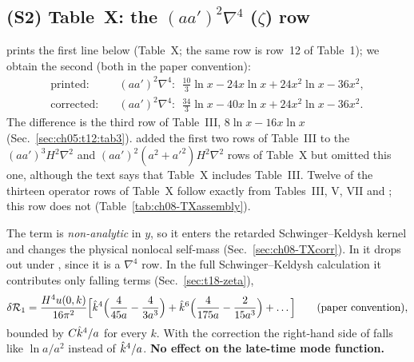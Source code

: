 \subsection*{(S2) Table~X: the $(aa')^2\nabla^4$ ($\zeta$) row}
\begin{discbox}
\PI{} prints the first line below (Table~X; the same row is row~12 of \PII{} Table~1); we obtain the second (both in the paper convention):
\[
\begin{aligned}
\text{printed:}&\quad (aa')^2\nabla^4:\ \ \tfrac{10}{3}\ln x-24x\ln x+24x^2\ln x-36x^2,\\
\text{corrected:}&\quad (aa')^2\nabla^4:\ \ \tfrac{34}{3}\ln x-40x\ln x+24x^2\ln x-36x^2 .
\end{aligned}
\]
The difference is the third row of Table~III, $8\ln x-16x\ln x$ (Sec.~\ref{sec:ch05:t12:tab3}). \PI{} added the first two rows of Table~III to the
$(aa')^3H^2\nabla^2$ and $(aa')^2(a^2+a'^2)H^2\nabla^2$ rows of Table~X but omitted this one, although the text says that Table~X includes Table~III.
Twelve of the thirteen operator rows of Table~X follow exactly from Tables~III, V, VII and ; this row does not
(Table~\ref{tab:ch08-TXassembly}).

The term is \emph{non-analytic} in $y$, so it enters the retarded Schwinger--Keldysh kernel and changes the physical nonlocal self-mass
(Sec.~\ref{sec:ch08-TXcorr}). In \PII{} it drops out under , since it is a $\nabla^4$ row. In the full Schwinger--Keldysh calculation it
contributes only falling terms (Sec.~\ref{sec:t18-zeta}),
\[
\delta\mathcal R_1=\frac{H^4u(0,k)}{16\pi^2}\Big[\hat k^4\Big(\frac{4}{45a}-\frac{4}{3a^3}\Big)+\hat k^6\Big(\frac{4}{175a}-\frac{2}{15a^3}\Big)+\ldots\Big]
\qquad\text{(paper convention)},
\]
bounded by $C\hat k^4/a$ for every $k$. With the correction the right-hand side of  falls like $\ln a/a^2$ instead of $\hat k^4/a$.
\textbf{No effect on the late-time mode function.}
\end{discbox}

